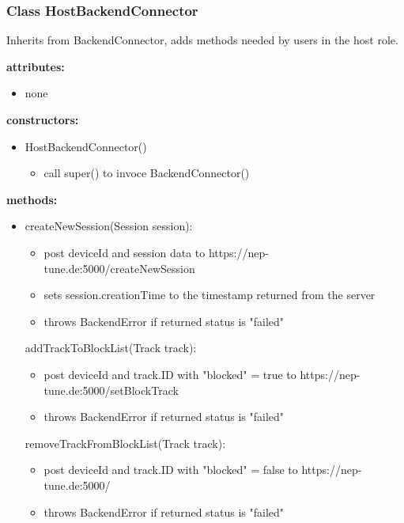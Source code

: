 \documentclass[oneside, nenglish]{sdqtechreport}
\begin{document}
\subsubsection{Class HostBackendConnector}
Inherits from BackendConnector, adds methods needed by users in the host role.

\textbf{attributes:}
\begin{itemize}
     \item none
\end{itemize}
\textbf{constructors:}
\begin{itemize}
    \item HostBackendConnector()
    \begin{itemize}
        \item call super() to invoce BackendConnector()
    \end{itemize}
\end{itemize}
\textbf{methods:}
\begin{itemize}
    \item createNewSession(Session session):
    \begin{itemize}
        \item post deviceId and session data to https://nep-tune.de:5000/createNewSession
        \item sets session.creationTime to the timestamp returned from the server
        \item throws BackendError if returned status is "failed"
    \end{itemize}
    addTrackToBlockList(Track track):
    \begin{itemize}
        \item post deviceId and track.ID with "blocked" = true to https://nep-tune.de:5000/setBlockTrack
        \item throws BackendError if returned status is "failed"
    \end{itemize}
    removeTrackFromBlockList(Track track):
    \begin{itemize}
        \item post deviceId and track.ID  with "blocked" = false to https://nep-tune.de:5000/
        \item throws BackendError if returned status is "failed"
    \end{itemize}
    
\end{itemize}
\end{document}
